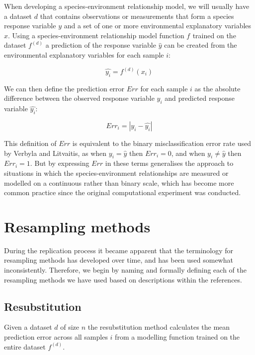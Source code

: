 When developing a species-environment relationship model, we will
usually have a dataset $d$ that contains observations or measurements
that form a species response variable $y$ and a set of one or more
environmental explanatory variables $x$. Using a species-environment
relationship model function $f^{}$ trained on the dataset $f^{(d)}$ a
prediction of the response variable $\hat{y}$ can be created from the
environmental explanatory variables for each sample $i$:

\begin{equation}
\hat{y_i} = f^{(d)}(x_i)
\end{equation}

We can then define the prediction error $Err$ for each sample $i$ as the
absolute difference between the observed response variable $y_i$ and
predicted response variable $\hat{y_i}$:

\begin{equation}
Err_i = | y_i - \hat{y_i} |
\end{equation}

This definition of $Err$ is equivalent to the binary misclassification
error rate used by Verbyla and Litvaitis\supercite{verbyla-1989}, as when
$y_i = \hat{y}$ then $Err_i = 0$, and when $y_i \neq \hat{y}$ then
$Err_i = 1$. But by expressing $Err$ in these terms generalises the
approach to situations in which the species-environment relationships
are measured or modelled on a continuous rather than binary scale, which
has become more common practice since the original computational
experiment was conducted.

\section{Resampling methods}

During the replication process it became apparent that the terminology
for resampling methods has developed over time, and has been used
somewhat inconsistently. Therefore, we begin by naming and formally
defining each of the resampling methods we have used based on
descriptions within the references.

\subsection{Resubstitution}

Given a dataset $d$ of size $n$ the resubstitution method calculates the
mean prediction error across all samples $i$ from a modelling function
trained on the entire dataset $f^{(d)}$.

